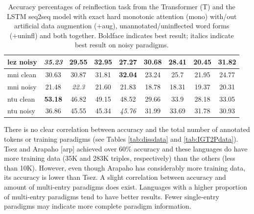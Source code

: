 \begin{table}[!tb]
\begin{tabular}{l|cccc|cccc}
      lez noisy & \textit{35.23} & 29.55 & 32.95 & 27.27          & 30.68 & 28.41 & 20.45 & 31.82 \\
      \hline
      mni clean & 30.63 & 30.87         & 31.81 & \textbf{32.04} & 23.24 & 25.7 & 21.95 & 24.77 \\
      mni noisy & 21.48 & \textit{22.3} & 21.60 & 21.83          & 18.78 & 18.31 & 19.37 & 20.31 \\
      \hline
      ntu clean & \textbf{53.18} & 46.82 & 49.15 & 48.52          & 29.66 & 33.9 & 28.18 & 33.05 \\
      ntu noisy & 36.86          & 45.55 & 45.34 & \textit{45.76} & 31.99 & 33.69 & 31.78 & 30.93 \\
    \end{tabular}
    \caption[IGT2P Results]{Accuracy percentages of reinflection task from the Transformer (T) and the LSTM seq2seq model with exact hard monotonic attention (mono) with/out artificial data augmention (+aug), unannotated/uninflected word forms (+uninfl) and both together. Boldface indicates best result; italics indicate best result on noisy paradigms.}
    \label{tab:IGT2Presults}
\end{table}

There is no clear correlation between accuracy and the total number of annotated tokens or training paradigms (see Tables \ref{tab:dissdata} and \ref{tab:IGT2Pdata}). Tsez and Arapaho [arp] achieved over 60\% accuracy and these languages do have more training data (35K and 283K triples, respectively) than the others (less than 10K). However, even though Arapaho has considerably more training data, its accuracy is lower than Tsez. A slight correlation between accuracy and amount of multi-entry paradigms does exist. Languages with a higher proportion of multi-entry paradigms tend to have better results. Fewer single-entry paradigms may indicate more complete paradigm information.

